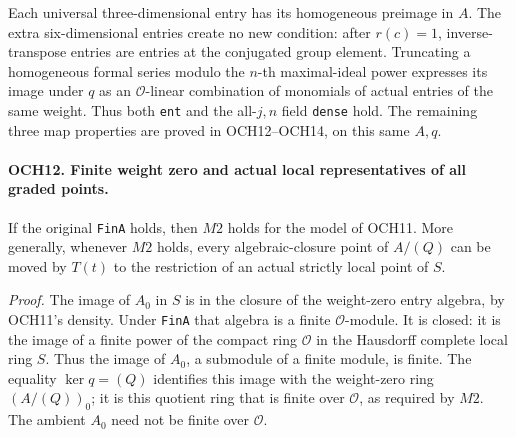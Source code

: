 Each universal three-dimensional entry has its homogeneous
preimage in \(A\).  The extra six-dimensional entries create
no new condition: after \(r(c)=1\), inverse-transpose entries
are entries at the conjugated group element.  Truncating a
homogeneous formal series modulo the \(n\)-th maximal-ideal
power expresses its image under \(q\) as an
\(\mathcal O\)-linear combination of monomials of actual
entries of the same weight.  Thus both \texttt{ent} and the
all-\(j,n\) field \texttt{dense} hold.  The remaining three
map properties are proved in OCH12--OCH14, on this same \(A,q\).

\paragraph{OCH12. Finite weight zero and actual local representatives of all graded points.}
\label{claim:OCH12}
If the original \texttt{FinA} holds, then
\(M2\) holds for the model of OCH11.  More generally, whenever
\(M2\) holds, every algebraic-closure point of \(A/(Q)\)
can be moved by \(T(t)\) to the restriction of an actual
strictly local point of \(S\).

\emph{Proof.}
The image of \(A_0\) in \(S\) is in the closure of the
weight-zero entry algebra, by OCH11's density.  Under
\texttt{FinA} that algebra is a finite \(\mathcal O\)-module.
It is closed: it is the image of a finite power of the compact ring
\(\mathcal O\) in the Hausdorff complete local ring \(S\).
Thus the image of \(A_0\), a submodule of a finite module, is
finite.  The equality \(\ker q=(Q)\) identifies this image
with the weight-zero ring \((A/(Q))_0\); it is this quotient
ring that is finite over \(\mathcal O\), as required by
\(M2\).  The ambient \(A_0\) need not be finite over
\(\mathcal O\).

